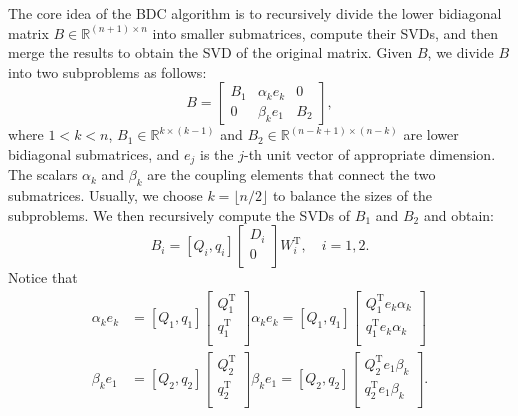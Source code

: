 \documentclass[12pt]{article}
\newcommand{\R}{\mathbb{R}}
\newcommand{\op}{\operatorname}
\begin{document}
The core idea of the BDC algorithm is to recursively divide the lower bidiagonal matrix \(B \in \R^{(n + 1) \times n}\) into smaller submatrices, compute their SVDs, and then merge the results to obtain the SVD of the original matrix. Given \(B\), we divide \(B\) into two subproblems as follows:
\[
    B = \begin{bmatrix}
        B_1 & \alpha_k e_k & 0 \\
        0 & \beta_k e_1 & B_2
    \end{bmatrix},
\]
where \(1 < k < n\), \(B_1 \in \R^{k \times (k - 1)}\) and \(B_2 \in \R^{(n - k + 1) \times (n - k)}\) are lower bidiagonal submatrices, and \(e_j\) is the \(j\)-th unit vector of appropriate dimension. The scalars \(\alpha_k\) and \(\beta_k\) are the coupling elements that connect the two submatrices. Usually, we choose \(k = \lfloor n / 2 \rfloor\) to balance the sizes of the subproblems. We then recursively compute the SVDs of \(B_1\) and \(B_2\) and obtain:
\[
    B_i = [Q_i, q_i] \begin{bmatrix}
        D_i \\
        0 \\
    \end{bmatrix} W_i^{\op T}, \quad i = 1, 2.
\]
Notice that
\[
    \begin{aligned}
        \alpha_k e_k &= [Q_1, q_1] \begin{bmatrix}
            Q_1^{\op T} \\
            q_1^{\op T} \\
        \end{bmatrix} \alpha_k e_k = [Q_1, q_1] \begin{bmatrix}
            Q_1^{\op T} e_k \alpha_k \\
            q_1^{\op T} e_k \alpha_k \\
        \end{bmatrix} \\
        \beta_k e_1 &= [Q_2, q_2] \begin{bmatrix}
            Q_2^{\op T} \\
            q_2^{\op T} \\
        \end{bmatrix} \beta_k e_1 = [Q_2, q_2] \begin{bmatrix}
            Q_2^{\op T} e_1 \beta_k \\
            q_2^{\op T} e_1 \beta_k \\
        \end{bmatrix}.
    \end{aligned}
\]
\end{document}

